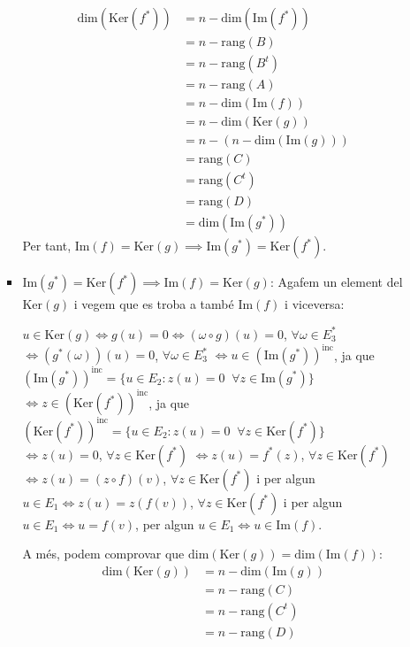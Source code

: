 \documentclass[11pt,a4paper]{article}
\begin{document}
\begin{enumerate}
\begin{enumerate}
\begin{itemize}
            \begin{align*}
                \text{dim}(\text{Ker}(f^*))&=n-\text{dim}(\text{Im}(f^*))\\
                &=n-\text{rang}(B)\\
                &=n-\text{rang}(B^t)\\
                &=n-\text{rang}(A)\\
                &=n-\text{dim}(\text{Im}(f))\\
                &=n-\text{dim}(\text{Ker}(g))\\
                &=n-(n-\text{dim}(\text{Im}(g)))\\
                &=\text{rang}(C)\\
                &=\text{rang}(C^t)\\
                &=\text{rang}(D)\\
                &=\text{dim}(\text{Im}(g^*))
            \end{align*}
            Per tant, $\text{Im}(f)=\text{Ker}(g)\implies\text{Im}(g^*)=\text{Ker}(f^*)$.
            \item $\text{Im}(g^*)=\text{Ker}(f^*)\implies\text{Im}(f)=\text{Ker}(g)$: Agafem un element del $\text{Ker}(g)$ i vegem que es troba a també $\text{Im}(f)$ i viceversa:\par $u\in\text{Ker}(g)\iff g(u)=0\iff (\omega\circ g)(u)=0$, $\forall\omega\in E_3^*$ $\iff (g^*(\omega))(u)=0$, $\forall\omega\in E_3^*$ $\iff u\in (\text{Im}(g^*))^{\text{inc}}$, ja que $(\text{Im}(g^*))^{\text{inc}}=\{u\in E_2:z(u)=0\;\;\forall z\in\text{Im}(g^*)\}$ $\iff z\in (\text{Ker}(f^*))^{\text{inc}}$, ja que $(\text{Ker}(f^*))^{\text{inc}}=\{u\in E_2:z(u)=0\;\;\forall z\in\text{Ker}(f^*)\}$ $\iff z(u)=0$, $\forall z\in \text{Ker}(f^*)$ $\iff z(u)=f^*(z)$, $\forall z\in \text{Ker}(f^*)$ $\iff z(u)=(z\circ f)(v)$, $\forall z\in \text{Ker}(f^*)$ i per algun $u\in E_1\iff z(u)=z(f(v))$, $\forall z\in \text{Ker}(f^*)$ i per algun $u\in E_1\iff u=f(v)$, per algun $u\in E_1\iff u\in \text{Im}(f)$.\par A més, podem comprovar que $\text{dim}(\text{Ker}(g))=\text{dim}(\text{Im}(f))$:
            \begin{align*}
                \text{dim}(\text{Ker}(g))&=n-\text{dim}(\text{Im}(g))\\
                &=n-\text{rang}(C)\\
                &=n-\text{rang}(C^t)\\
                &=n-\text{rang}(D)\\

\end{align*}
\end{itemize}
\end{enumerate}
\end{enumerate}
\end{document}
